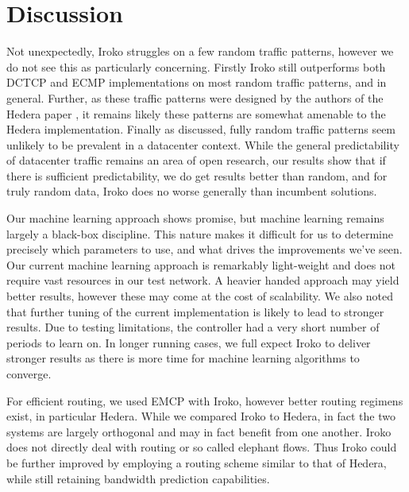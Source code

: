 \section{Discussion}
\label{sec:discussion}

Not unexpectedly, Iroko struggles on a few random traffic patterns, however we
do not see this as particularly concerning. Firstly Iroko still outperforms
both DCTCP and ECMP implementations on most random traffic patterns, and in general.
Further, as these traffic patterns
were designed by the authors of the Hedera paper \cite{hedera}, it remains
likely these patterns are somewhat amenable to the Hedera implementation.
Finally as discussed, fully random traffic patterns seem unlikely to be prevalent in a
datacenter context. While the general predictability of datacenter
traffic remains an area of open research, our results show that
if there is sufficient predictability, we do get results better than
random, and for truly random data, Iroko does no worse generally than
incumbent solutions. 

Our machine learning approach shows promise, but machine learning remains
largely a black-box discipline. This nature makes it difficult for us
to determine precisely which parameters to use, and what drives
the improvements we've seen. Our current machine learning approach
is remarkably light-weight and does not require vast resources
in our test network. A heavier handed approach may yield better
results, however these may come at the cost of scalability. We
also noted that further tuning of the current implementation is
likely to lead to stronger results. Due to testing limitations, 
the controller had a very short number of periods to learn 
on. In longer running cases, we full expect Iroko to 
deliver stronger results as there is more time for machine learning 
algorithms to converge. 

For efficient routing, we used EMCP with Iroko, however better
routing regimens exist, in particular Hedera. While we compared
Iroko to Hedera, in fact the two systems are largely orthogonal
and may in fact benefit from one another. Iroko does not directly deal
with routing or so called elephant flows. Thus Iroko could be
further improved by employing a routing scheme similar to that of
Hedera, while still retaining bandwidth prediction capabilities.


